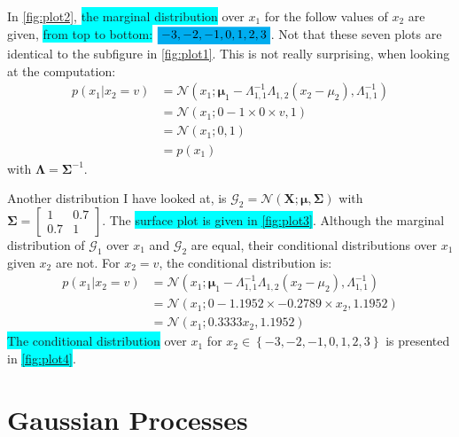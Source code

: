 \documentclass[a4paper,11pt]{article}
\newcommand{\V}[1]{\ensuremath{\mathbf{#1}}}
\newcommand{\mean}{\ensuremath{\boldsymbol{\mu}}}
\newcommand{\cov}{\ensuremath{\boldsymbol{\Sigma}}}
\newcommand{\npdf}{\ensuremath{\mathcal{N}}}
\newcommand{\hl}[1]{\colorbox{cyan}{#1}}
\newcommand{\mhl}[1]{\mathchoice%
  {\colorbox{cyan}{$\displaystyle#1$}}%
  {\colorbox{cyan}{$\textstyle#1$}}%
  {\colorbox{cyan}{$\scriptstyle#1$}}%
  {\colorbox{cyan}{$\scriptscriptstyle#1$}}}
\begin{document}
  In \autoref{fig:plot2}, \hl{the marginal distribution} over $x_1$ for the follow values of $x_2$ are given, \hl{from top to bottom:} $\mhl{-3, -2, -1, 0, 1, 2, 3}$.  Not that these seven plots are identical to the subfigure in \autoref{fig:plot1}.  This is not really surprising, when looking at the computation:
  \begin{align*}
    p(x_1 | x_2 = v) 
    &= \npdf(x_1; \mean_1 - \Lambda_{1,1}^{-1} \Lambda_{1,2} (x_2 - \mu_2), \Lambda_{1,1}^{-1}) \\
    &= \npdf(x_1; 0 - 1  \times 0 \times v, 1) \\
    &= \npdf(x_1; 0, 1) \\
    &= p(x_1)
  \end{align*}
  with $\V{\Lambda} = \cov^{-1}$.

  Another distribution I have looked at, is $\mathcal G_2 = \npdf(\V{X}; \mean, \cov)$ with $\cov = \begin{bmatrix}1 & 0.7 \\ 0.7 & 1\end{bmatrix}$.  The \hl{surface plot is given in \autoref{fig:plot3}}.  Although the marginal distribution of $\mathcal G_1$ over $x_1$ and $\mathcal G_2$ are equal, their conditional distributions over $x_1$ given $x_2$ are not.  For $x_2 = v$, the conditional distribution is:
    \begin{align*}
      p(x_1 | x_2 = v)
      &= \npdf(x_1; \mean_1 - \Lambda_{1,1}^{-1} \Lambda_{1,2} (x_2 - \mu_2), \Lambda_{1,1}^{-1}) \\
      &= \npdf(x_1; 0 - 1.1952 \times -0.2789 \times x_2, 1.1952) \\
      &= \npdf(x_1; 0.3333 x_2, 1.1952)
    \end{align*}
\hl{The conditional distribution} over $x_1$ for $x_2 \in \left\{-3, -2, -1, 0, 1, 2, 3\right\}$ is presented in \hl{\autoref{fig:plot4}}.


\section{Gaussian Processes}
\end{document}
